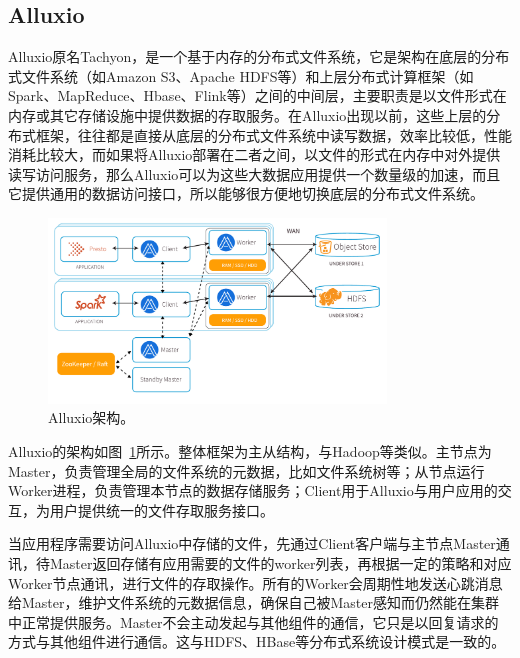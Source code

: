 \subsection{Alluxio}
\label{subsec:alluxio}

\par Alluxio原名Tachyon，是一个基于内存的分布式文件系统，它是架构在底层的分布式文件系统（如Amazon S3、Apache HDFS等）和上层分布式计算框架（如Spark、MapReduce、Hbase、Flink等）之间的中间层，主要职责是以文件形式在内存或其它存储设施中提供数据的存取服务。在Alluxio出现以前，这些上层的分布式框架，往往都是直接从底层的分布式文件系统中读写数据，效率比较低，性能消耗比较大，而如果将Alluxio部署在二者之间，以文件的形式在内存中对外提供读写访问服务，那么Alluxio可以为这些大数据应用提供一个数量级的加速，而且它提供通用的数据访问接口，所以能够很方便地切换底层的分布式文件系统。

\begin{figure}[]
	\centering
	\includegraphics[width=0.8\textwidth]{img/column-aware/alluxio-archi}
	
	\caption{Alluxio架构。}
	\label{fig:alluxio-archi}
\end{figure}

\par Alluxio的架构如图~\ref{fig:alluxio-archi}所示。整体框架为主从结构，与Hadoop\cite{hdfs}等类似。主节点为Master，负责管理全局的文件系统的元数据，比如文件系统树等；从节点运行Worker进程，负责管理本节点的数据存储服务；Client用于Alluxio与用户应用的交互，为用户提供统一的文件存取服务接口。

\par 当应用程序需要访问Alluxio中存储的文件，先通过Client客户端与主节点Master通讯，待Master返回存储有应用需要的文件的worker列表，再根据一定的策略和对应Worker节点通讯，进行文件的存取操作。所有的Worker会周期性地发送心跳消息给Master，维护文件系统的元数据信息，确保自己被Master感知而仍然能在集群中正常提供服务。Master不会主动发起与其他组件的通信，它只是以回复请求的方式与其他组件进行通信。这与HDFS、HBase等分布式系统设计模式是一致的。

